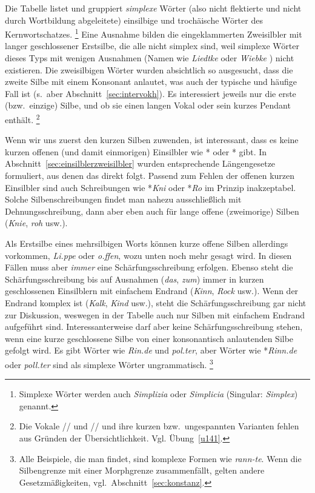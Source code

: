 Die Tabelle listet und gruppiert \textit{simplexe} Wörter (also nicht flektierte und nicht durch Wortbildung abgeleitete) einsilbige und trochäische Wörter des Kernwortschatzes.%
\footnote{Simplexe Wörter werden auch \textit{Simplizia} oder \textit{Simplicia} (Singular: \textit{Simplex}) genannt.}
Eine Ausnahme bilden die eingeklammerten Zweisilbler mit langer geschlossener Erstsilbe, die alle nicht simplex sind, weil simplexe Wörter dieses Typs mit wenigen Ausnahmen (\zB Namen wie \textit{Liedtke} \textipa{[li:tk@]} oder \textit{Wiebke} \textipa{[vi:pk@]}) nicht existieren.\label{abs:wiebke}
Die zweisilbigen Wörter wurden absichtlich so ausgesucht, dass die zweite Silbe mit einem Konsonant anlautet, was auch der typische und häufige Fall ist (s.\ aber Abschnitt~\ref{sec:intervokh}).
Es interessiert jeweils nur die erste (bzw.\ einzige) Silbe, und ob sie einen langen Vokal oder sein kurzes Pendant enthält.%
\footnote{Die Vokale /\textipa{\o}/ und // und ihre kurzen bzw.\ ungespannten Varianten fehlen aus Gründen der Übersichtlichkeit.
Vgl. Übung~\ref{u141}.}

Wenn wir uns zuerst den kurzen Silben zuwenden, ist interessant, dass es keine kurzen offenen (und damit einmorigen) Einsilbler wie *\textipa{[knI]} oder *\textipa{[KO]} gibt.
In Abschnitt~\ref{sec:einsilblerzweisilbler} wurden entsprechende Längengesetze formuliert, aus denen das direkt folgt.
Passend zum Fehlen der offenen kurzen Einsilbler sind auch Schreibungen wie *\textit{Kni} oder *\textit{Ro} im Prinzip inakzeptabel.
Solche Silbenschreibungen findet man nahezu ausschließlich mit Dehnungsschreibung, dann aber eben auch für lange offene (zweimorige) Silben (\textit{Knie}, \textit{roh} usw.).

Als Erstsilbe eines mehrsilbigen Worts können kurze offene Silben allerdings vorkommen, \zB \textit{Li.ppe} oder \textit{o.ffen}, wozu unten noch mehr gesagt wird.
In diesen Fällen muss aber \textit{immer} eine Schärfungsschreibung erfolgen.
Ebenso steht die Schärfungsschreibung bis auf Ausnahmen (\textit{das}, \textit{zum}) immer in kurzen geschlossenen Einsilblern mit einfachem Endrand (\textit{Kinn}, \textit{Rock} usw.).
Wenn der Endrand komplex ist (\textit{Kalk}, \textit{Kind} usw.), steht die Schärfungsschreibung gar nicht zur Diskussion, weswegen in der Tabelle auch nur Silben mit einfachem Endrand aufgeführt sind.
Interessanterweise darf aber keine Schärfungsschreibung stehen, wenn eine kurze geschlossene Silbe von einer konsonantisch anlautenden Silbe gefolgt wird.
Es gibt Wörter wie \textit{Rin.de} und \textit{pol.ter}, aber Wörter wie *\textit{Rinn.de} oder \textit{poll.ter} sind als simplexe Wörter ungrammatisch.%
\footnote{Alle Beispiele, die man findet, sind komplexe Formen wie \textit{rann-te}.
Wenn die Silbengrenze mit einer Morphgrenze zusammenfällt, gelten andere Gesetzmäßigkeiten, vgl.\ Abschnitt~\ref{sec:konstanz}.}

